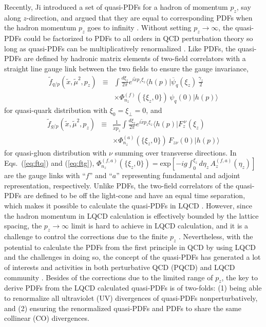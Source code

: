 Recently, Ji introduced a set of quasi-PDFs for a hadron of momentum $p_z$, say along $z$-direction, and argued that they are equal to corresponding PDFs when the hadron momentum $p_z$ goes to infinity \cite{Ji:2013dva}.
Without setting $p_z\to\infty$, the quasi-PDFs could be factorized to PDFs to all orders in QCD perturbation theory so long as quasi-PDFs can be multiplicatively renormalized \cite{Ma:2014jla}.
Like PDFs, the quasi-PDFs are defined by hadronic matrix elements of two-field correlators with a straight line gauge link between the two fields to ensure the gauge invariance,
\begin{eqnarray}
\label{eq:ftq}
\tilde{f}_{q/p}(\tilde{x},\tilde{\mu}^2,p_z)
&\equiv &
\int \frac{d\xi_z}{2\pi} e^{i \tilde{x}p_z \xi_z}\langle h(p)| \overline{\psi}_q(\xi_z)\,\frac{\gamma_z}{2}
\nonumber\\
&\ & \times
\Phi_{n_z}^{(f)}(\{\xi_z,0\})\, \psi_q(0) | h(p) \rangle
\end{eqnarray}
for quasi-quark distribution with $\xi_0=\xi_\perp=0$, and
\begin{eqnarray}
\label{eq:ftg}
\tilde{f}_{g/p}(\tilde{x},\tilde{\mu}^2,p_z)
&\equiv &
\frac{1}{\tilde{x}p_z}
\int \frac{d\xi_z}{2\pi} e^{i \tilde{x} p_z \xi_z}\langle h(p)| F_{z}^{\ \nu}(\xi_z)\,
\nonumber\\
&\ & \times
\Phi_{n_z}^{(a)}(\{\xi_z,0\})\, F_{z\nu}(0) | h(p) \rangle
\end{eqnarray}
for quasi-gluon distribution with $\nu$ summing over transverse directions.
In Eqs.~(\ref{eq:ftq}) and (\ref{eq:ftg}), $\Phi_{n_z}^{(f,a)}(\{\xi_z,0\}) = \text{exp}[-ig\int_0^{\xi_z} d\eta_z\, A^{(f,a)}_z(\eta_z)]$ are the gauge links with ``$f$'' and ``$a$'' representing fundamental and adjoint representation, respectively.
Unlike PDFs, the two-field correlators of the quasi-PDFs are defined to be off the light-cone and have an equal time separation, which makes it possible to calculate the quasi-PDFs in LQCD \cite{Lin:2014zya,Alexandrou:2015rja,Chen:2016utp,Zhang:2017bzy,Orginos:2017kos}.
However, since the hadron momentum in LQCD calculation is effectively bounded by the lattice spacing, the $p_z\to\infty$ limit is hard to achieve in LQCD calculation, and it is a challenge to control the corrections due to the finite $p_z$ \cite{Ji:2014gla,Ji:2017rah}.  Nevertheless, with the potential to calculate the PDFs from the first principle in QCD by using LQCD and the challenges in doing so, the concept of the quasi-PDFs has generated a lot of interests and activities in both perturbative QCD (PQCD) and LQCD community \cite{Ji:2014hxa,Gamberg:2014zwa,Jia:2015pxx,Li:2016amo,Bacchetta:2016zjm,Radyushkin:2016hsy,Radyushkin:2017gjd,Gbedo:2017eyp,Radyushkin:2017ffo,Carlson:2017gpk,Briceno:2017cpo,Nam:2017gzm,Xiong:2017jtn,Radyushkin:2017cyf,Constantinou:2017sej,Yoon:2017qzo,Rossi:2017muf}.  Besides of the corrections due to the limited range of $p_z$, the key to derive PDFs from the LQCD calculated quasi-PDFs is of two-folds:  (1) being able to renormalize all ultraviolet (UV) divergences of quasi-PDFs nonperturbatively, and (2) ensuring the renormalized quasi-PDFs and PDFs to share the same collinear (CO) divergences.

